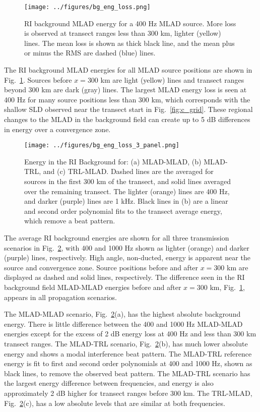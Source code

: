 \documentclass[preprint,NumberedRefs]{JASA}
\begin{document}
\begin{figure}
\texttt{[image: ../figures/bg\_eng\_loss.png]}
    \caption{RI background MLAD energy for a 400 Hz MLAD source. More loss is observed at transect ranges less than 300 km, lighter (yellow) lines. The mean loss is shown as thick black line, and the mean plus or minus the RMS are dashed (blue) lines.}
    \label{fig:bg_eng}
\end{figure}
The RI background MLAD energies for all MLAD source positions are shown in Fig.~\ref{fig:bg_eng}. Sources before $x=$300 km are light (yellow) lines and transect ranges beyond 300 km are dark (gray) lines. The largest MLAD energy loss is seen at 400 Hz for many source positions less than 300 km, which corresponds with the shallow SLD observed near the transect start in Fig.~\ref{fig:c_grid}. These regional changes to the MLAD in the background field can create up to 5 dB differences in energy over a convergence zone.

\begin{figure}
\texttt{[image: ../figures/bg\_eng\_loss\_3\_panel.png]}
        \caption{Energy in the RI Background for: (a) MLAD-MLAD, (b) MLAD-TRL, and (c) TRL-MLAD. Dashed lines are the averaged for sources in the first 300 km of the transect, and solid lines averaged over the remaining transect. The lighter (orange) lines are 400 Hz, and darker (purple) lines are 1 kHz. Black lines in (b) are a linear and second order polynomial fits to the transect average energy, which remove a beat pattern.}
    \label{fig:eng_bg_3}
\end{figure}
The average RI background energies are shown for all three transmission scenarios in Fig.~\ref{fig:eng_bg_3}, with 400 and 1000 Hz shown as lighter (orange) and darker (purple) lines, respectively. High angle, non-ducted, energy is apparent near the source and convergence zone. Source positions before and after $x=300$ km are displayed as dashed and solid lines, respectively. The difference seen in the RI background field MLAD-MLAD energies before and after $x=300$ km, Fig.~\ref{fig:bg_eng}, appears in all propagation scenarios.

The MLAD-MLAD scenario, Fig.~\ref{fig:eng_bg_3}(a), has the highest absolute background energy. There is little difference between the 400 and 1000 Hz MLAD-MLAD energies except for the excess of 2 dB energy loss at 400 Hz and less than 300 km transect ranges. The MLAD-TRL scenario, Fig.~\ref{fig:eng_bg_3}(b), has much lower absolute energy and shows a modal interference beat pattern. The MLAD-TRL reference energy is fit to first and second order polynomials at 400 and 1000 Hz, shown as black lines, to remove the observed beat pattern. The MLAD-TRL scenario has the largest energy difference between frequencies, and energy is also approximately 2 dB higher for transect ranges before 300 km. The TRL-MLAD, Fig.~\ref{fig:eng_bg_3}(c), has a low absolute levels that are similar at both frequencies.
\end{document}
